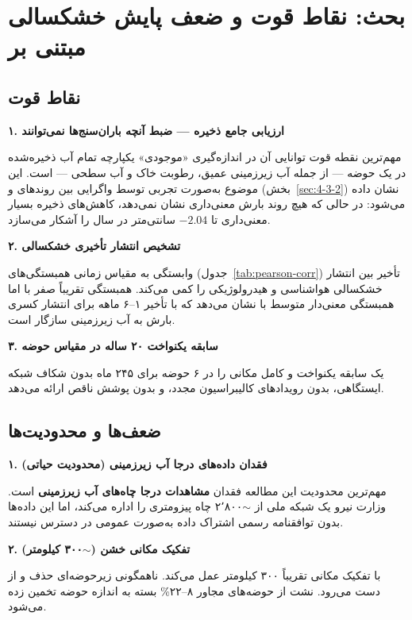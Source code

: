 \documentclass[12pt, a4paper]{article}
\begin{document}
\section{بحث: نقاط قوت و ضعف پایش خشکسالی مبتنی بر }
\label{sec:4-6}

\subsection{نقاط قوت}
\label{sec:4-6-1}

\textbf{۱. ارزیابی جامع ذخیره — ضبط آنچه باران‌سنج‌ها نمی‌توانند}

مهم‌ترین نقطه قوت  توانایی آن در اندازه‌گیری «موجودی» یکپارچه تمام آب
ذخیره‌شده در یک حوضه — از جمله آب زیرزمینی عمیق، رطوبت خاک و آب سطحی — است. این
موضوع به‌صورت تجربی توسط واگرایی بین روندهای  و  (بخش~\ref{sec:4-3-2})
نشان داده می‌شود: در حالی که  هیچ روند بارش معنی‌داری نشان نمی‌دهد،
 کاهش‌های ذخیره بسیار معنی‌داری تا $-2.04$ سانتی‌متر در سال را آشکار می‌سازد.

\textbf{۲. تشخیص انتشار تأخیری خشکسالی}

وابستگی به مقیاس زمانی همبستگی‌های  (جدول~\ref{tab:pearson-corr}) تأخیر
بین انتشار خشکسالی هواشناسی و هیدرولوژیکی را کمی می‌کند.  همبستگی تقریباً
صفر با  اما همبستگی معنی‌دار متوسط با  نشان می‌دهد که با تأخیر
۱–۶ ماهه برای انتشار کسری بارش به آب زیرزمینی سازگار است.

\textbf{۳. سابقه یکنواخت ۲۰ ساله در مقیاس حوضه}

 یک سابقه یکنواخت و کامل مکانی را در ۶ حوضه برای ۲۴۵ ماه بدون شکاف شبکه
ایستگاهی، بدون رویدادهای کالیبراسیون مجدد، و بدون پوشش ناقص ارائه می‌دهد.

\subsection{ضعف‌ها و محدودیت‌ها}
\label{sec:4-6-2}

\textbf{۱. فقدان داده‌های درجا آب زیرزمینی (محدودیت حیاتی)}

مهم‌ترین محدودیت این مطالعه فقدان \textbf{مشاهدات درجا چاه‌های آب زیرزمینی} است.
وزارت نیرو یک شبکه ملی از $\sim$۲٬۸۰۰ چاه پیزومتری را اداره می‌کند، اما این داده‌ها
بدون توافقنامه رسمی اشتراک داده به‌صورت عمومی در دسترس نیستند.

\textbf{۲. تفکیک مکانی خشن ($\sim$۳۰۰ کیلومتر)}

 با تفکیک مکانی تقریباً ۳۰۰ کیلومتر عمل می‌کند. ناهمگونی زیرحوضه‌ای
حذف و از دست می‌رود. نشت از حوضه‌های مجاور ۸–۲۲\% بسته به اندازه حوضه تخمین زده
می‌شود.
\end{document}
